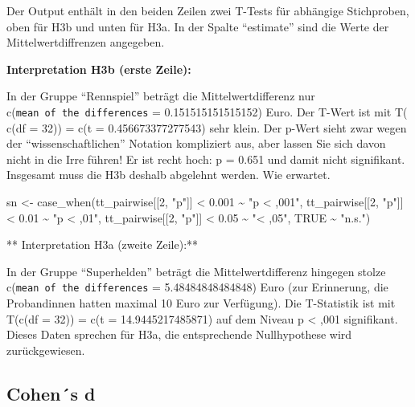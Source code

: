 \documentclass[
]{book}
\newenvironment{Shaded}{\begin{snugshade}}{\end{snugshade}}
\newcommand{\ConstantTok}[1]{\textcolor[rgb]{0.00,0.00,0.00}{#1}}
\newcommand{\DecValTok}[1]{\textcolor[rgb]{0.00,0.00,0.81}{#1}}
\newcommand{\FloatTok}[1]{\textcolor[rgb]{0.00,0.00,0.81}{#1}}
\newcommand{\FunctionTok}[1]{\textcolor[rgb]{0.00,0.00,0.00}{#1}}
\newcommand{\NormalTok}[1]{#1}
\newcommand{\OtherTok}[1]{\textcolor[rgb]{0.56,0.35,0.01}{#1}}
\newcommand{\SpecialCharTok}[1]{\textcolor[rgb]{0.00,0.00,0.00}{#1}}
\newcommand{\StringTok}[1]{\textcolor[rgb]{0.31,0.60,0.02}{#1}}
\begin{document}
Der Output enthält in den beiden Zeilen zwei T-Tests für abhängige Stichproben, oben für H3b und unten für H3a. In der Spalte ``estimate'' sind die Werte der Mittelwertdiffrenzen angegeben.

\textbf{Interpretation H3b (erste Zeile):}

In der Gruppe ``Rennspiel'' beträgt die Mittelwertdifferenz nur c(\texttt{mean\ of\ the\ differences} = 0.151515151515152) Euro. Der T-Wert ist mit T( c(df = 32)) = c(t = 0.456673377277543) sehr klein. Der p-Wert sieht zwar wegen der ``wissenschaftlichen'' Notation kompliziert aus, aber lassen Sie sich davon nicht in die Irre führen! Er ist recht hoch: p = 0.651 und damit nicht signifikant. Insgesamt muss die H3b deshalb abgelehnt werden. Wie erwartet.

\begin{Shaded}
\begin{Highlighting}[]
\NormalTok{sn }\OtherTok{\textless{}{-}} \FunctionTok{case\_when}\NormalTok{(tt\_pairwise[[}\DecValTok{2}\NormalTok{, }\StringTok{"p"}\NormalTok{]] }\SpecialCharTok{\textless{}} \FloatTok{0.001} \SpecialCharTok{\textasciitilde{}} \StringTok{"p \textless{} ,001"}\NormalTok{,}
\NormalTok{                tt\_pairwise[[}\DecValTok{2}\NormalTok{, }\StringTok{"p"}\NormalTok{]] }\SpecialCharTok{\textless{}} \FloatTok{0.01} \SpecialCharTok{\textasciitilde{}} \StringTok{"p \textless{} ,01"}\NormalTok{,}
\NormalTok{                tt\_pairwise[[}\DecValTok{2}\NormalTok{, }\StringTok{"p"}\NormalTok{]] }\SpecialCharTok{\textless{}} \FloatTok{0.05} \SpecialCharTok{\textasciitilde{}} \StringTok{"\textless{} ,05"}\NormalTok{,}
                \ConstantTok{TRUE} \SpecialCharTok{\textasciitilde{}} \StringTok{"n.s."}\NormalTok{)}
\end{Highlighting}
\end{Shaded}

** Interpretation H3a (zweite Zeile):**

In der Gruppe ``Superhelden'' beträgt die Mittelwertdifferenz hingegen stolze c(\texttt{mean\ of\ the\ differences} = 5.48484848484848) Euro (zur Erinnerung, die Probandinnen hatten maximal 10 Euro zur Verfügung). Die T-Statistik ist mit T(c(df = 32)) = c(t = 14.9445217485871) auf dem Niveau p \textless{} ,001 signifikant. Dieses Daten sprechen für H3a, die entsprechende Nullhypothese wird zurückgewiesen.

\hypertarget{cohens-d-2}{%
\subsection{Cohen´s d}\label{cohens-d-2}}
\end{document}
